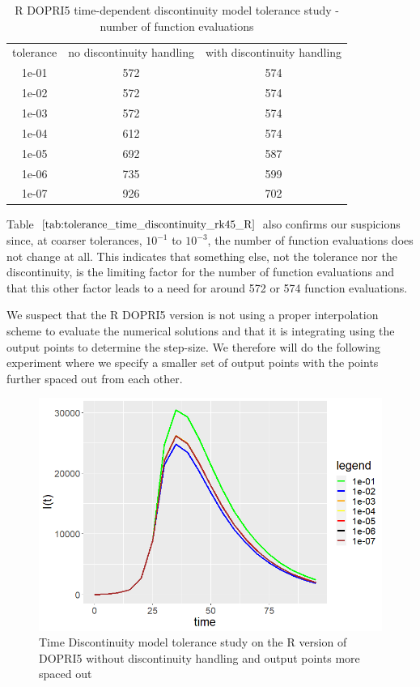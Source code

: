 \begin{table}[H]
\caption {R DOPRI5 time-dependent discontinuity model tolerance study - number of function evaluations} \label{tab:tolerance_time_discontinuity_rk45_R} 
\begin{center}
\begin{tabular}{ c c c }
tolerance & no discontinuity handling & with discontinuity handling\\ 
1e-01 & 572 & 574 \\
1e-02 & 572 & 574 \\
1e-03 & 572 & 574 \\
1e-04 & 612 & 574 \\
1e-05 & 692 & 587 \\
1e-06 & 735 & 599 \\
1e-07 & 926 & 702 \\
\end{tabular}
\end{center}
\end{table}

Table $\ref{tab:tolerance_time_discontinuity_rk45_R}$ also confirms our suspicions since, at coarser tolerances, $10^{-1}$ to $10^{-3}$, the number of function evaluations does not change at all. This indicates that something else, not the tolerance nor the discontinuity, is the limiting factor for the number of function evaluations and that this other factor leads to a need for around 572 or 574 function evaluations.

We suspect that the R DOPRI5 version is not using a proper interpolation scheme to evaluate the numerical solutions and that it is integrating using the output points to determine the step-size. We therefore will do the following experiment where we specify a smaller set of output points with the points further spaced out from each other.

\begin{figure}[H]
\centering
\includegraphics[width=0.7\linewidth]{./figures/tolerance_time_rk45_further_no_event_R}
\caption{Time Discontinuity model tolerance study on the R version of DOPRI5 without discontinuity handling and output points more spaced out}
\label{fig:tolerance_time_rk45_further_no_event_R}
\end{figure}

